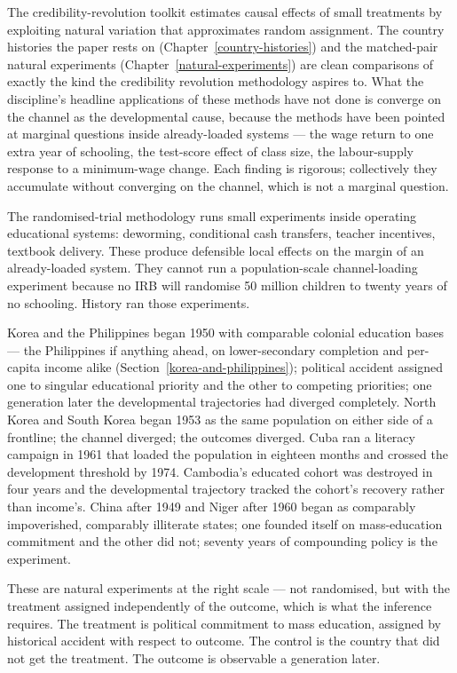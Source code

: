\documentclass[12pt,letterpaper]{article}
\begin{document}
The credibility-revolution toolkit estimates causal effects of small
treatments by exploiting natural variation that approximates random
assignment. The country histories the paper rests on
(Chapter~\ref{country-histories}) and the matched-pair natural
experiments (Chapter~\ref{natural-experiments}) are clean
comparisons of exactly the kind the credibility revolution
methodology aspires to. What the discipline's headline applications
of these methods have not done is converge on the channel as the
developmental cause, because the methods have been pointed at
marginal questions inside already-loaded systems --- the wage return
to one extra year of schooling, the test-score effect of class size,
the labour-supply response to a minimum-wage change. Each finding is
rigorous; collectively they accumulate without converging on the
channel, which is not a marginal question.

The randomised-trial methodology runs small experiments inside
operating educational systems: deworming, conditional cash transfers,
teacher incentives, textbook delivery. These produce defensible local
effects on the margin of an already-loaded system. They cannot run
a population-scale channel-loading experiment because no IRB will
randomise 50 million children to twenty years of no schooling. History
ran those experiments.

Korea and the Philippines began 1950 with comparable colonial
education bases --- the Philippines if anything ahead, on
lower-secondary completion and per-capita income alike
(Section~\ref{korea-and-philippines}); political accident assigned one
to singular educational priority and the other to competing
priorities; one generation later the developmental trajectories had
diverged completely.
North Korea and South Korea began 1953 as the same population on
either side of a frontline; the channel diverged; the outcomes
diverged. Cuba ran a literacy campaign in 1961 that loaded the
population in eighteen months and crossed the development threshold by
1974. Cambodia's educated cohort was destroyed in four years and the
developmental trajectory tracked the cohort's recovery rather than
income's. China after 1949 and Niger after 1960 began as comparably
impoverished, comparably illiterate states; one founded itself on
mass-education commitment and the other did not; seventy years of
compounding policy is the experiment.

These are natural experiments at the right scale --- not randomised, but with the treatment assigned independently of the outcome, which is what the inference requires. The treatment
is political commitment to mass education, assigned by historical
accident with respect to outcome. The control is the country that did
not get the treatment. The outcome is observable a generation later.
\end{document}
